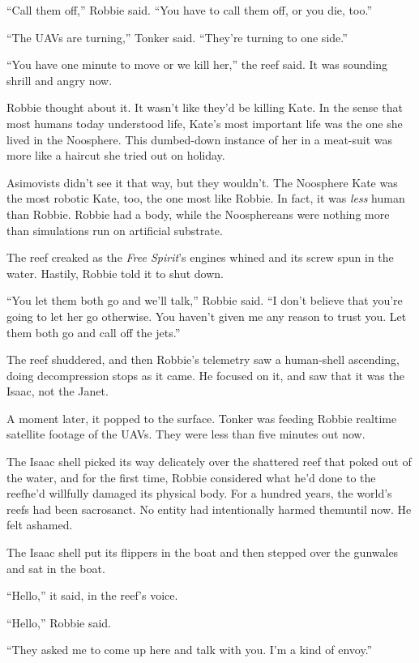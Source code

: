 “Call them off,” Robbie said. “You have to call them off, or you
die, too.”

“The UAVs are turning,” Tonker said. “They’re turning to one
side.”

“You have one minute to move or we kill her,” the reef said. It was
sounding shrill and angry now.

Robbie thought about it. It wasn’t like they’d be killing Kate. In
the sense that most humans today understood life, Kate’s most
important life was the one she lived in the Noosphere. This
dumbed-down instance of her in a meat-suit was more like a haircut
she tried out on holiday.

Asimovists didn’t see it that way, but they wouldn’t. The Noosphere
Kate was the most robotic Kate, too, the one most like Robbie. In
fact, it was \emph{less} human than Robbie. Robbie had a body,
while the Noosphereans were nothing more than simulations run on
artificial substrate.

The reef creaked as the \emph{Free Spirit}’s engines whined and its
screw spun in the water. Hastily, Robbie told it to shut down.

“You let them both go and we’ll talk,” Robbie said. “I don’t
believe that you’re going to let her go otherwise. You haven’t
given me any reason to trust you. Let them both go and call off the
jets.”

The reef shuddered, and then Robbie’s telemetry saw a human-shell
ascending, doing decompression stops as it came. He focused on it,
and saw that it was the Isaac, not the Janet.

A moment later, it popped to the surface. Tonker was feeding Robbie
realtime satellite footage of the UAVs. They were less than five
minutes out now.

The Isaac shell picked its way delicately over the shattered reef
that poked out of the water, and for the first time, Robbie
considered what he’d done to the reef\dash{}he’d willfully damaged its
physical body. For a hundred years, the world’s reefs had been
sacrosanct. No entity had intentionally harmed them\dash{}until now. He
felt ashamed.

The Isaac shell put its flippers in the boat and then stepped over
the gunwales and sat in the boat.

“Hello,” it said, in the reef’s voice.

“Hello,” Robbie said.

“They asked me to come up here and talk with you. I’m a kind of
envoy.”

